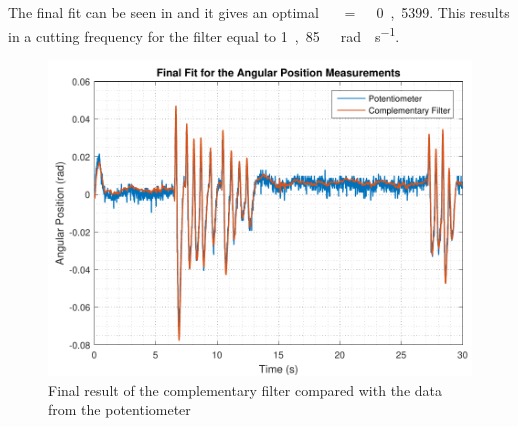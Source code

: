 The final fit can be seen in  and it gives an optimal \si{\tau\ =\ 0,5399}. This results in a cutting frequency for the filter equal to \si{1,85\ rad \cdot s^{-1}}.
%
\begin{figure}[H]
	\centering
	\includegraphics[scale=0.65]{figures/filterSensTool}
	\caption{Final result of the complementary filter compared with the data from the potentiometer}
	\label{filterSensTool}
\end{figure}\vspace{-5mm}
%